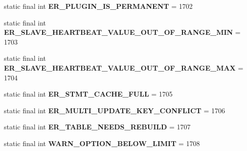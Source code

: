 \begin{DoxyCompactItemize}
static final int {\bfseries E\+R\+\_\+\+P\+L\+U\+G\+I\+N\+\_\+\+I\+S\+\_\+\+P\+E\+R\+M\+A\+N\+E\+NT} = 1702
\item 
\mbox{\label{classcom_1_1mysql_1_1jdbc_1_1_mysql_error_numbers_a6cb2fff2f0e4d19f239d44ee45fcc481}} 
static final int {\bfseries E\+R\+\_\+\+S\+L\+A\+V\+E\+\_\+\+H\+E\+A\+R\+T\+B\+E\+A\+T\+\_\+\+V\+A\+L\+U\+E\+\_\+\+O\+U\+T\+\_\+\+O\+F\+\_\+\+R\+A\+N\+G\+E\+\_\+\+M\+IN} = 1703
\item 
\mbox{\label{classcom_1_1mysql_1_1jdbc_1_1_mysql_error_numbers_a74ff538f3b76cb53e252ac11763fd349}} 
static final int {\bfseries E\+R\+\_\+\+S\+L\+A\+V\+E\+\_\+\+H\+E\+A\+R\+T\+B\+E\+A\+T\+\_\+\+V\+A\+L\+U\+E\+\_\+\+O\+U\+T\+\_\+\+O\+F\+\_\+\+R\+A\+N\+G\+E\+\_\+\+M\+AX} = 1704
\item 
\mbox{\label{classcom_1_1mysql_1_1jdbc_1_1_mysql_error_numbers_a0cd38cfd13a5d7d4a171f3716227128c}} 
static final int {\bfseries E\+R\+\_\+\+S\+T\+M\+T\+\_\+\+C\+A\+C\+H\+E\+\_\+\+F\+U\+LL} = 1705
\item 
\mbox{\label{classcom_1_1mysql_1_1jdbc_1_1_mysql_error_numbers_a3526dd0f26d6892cfc7b68efbaab62eb}} 
static final int {\bfseries E\+R\+\_\+\+M\+U\+L\+T\+I\+\_\+\+U\+P\+D\+A\+T\+E\+\_\+\+K\+E\+Y\+\_\+\+C\+O\+N\+F\+L\+I\+CT} = 1706
\item 
\mbox{\label{classcom_1_1mysql_1_1jdbc_1_1_mysql_error_numbers_a35347c98abfa0fa6dc2bf7c9ce850dd2}} 
static final int {\bfseries E\+R\+\_\+\+T\+A\+B\+L\+E\+\_\+\+N\+E\+E\+D\+S\+\_\+\+R\+E\+B\+U\+I\+LD} = 1707
\item 
\mbox{\label{classcom_1_1mysql_1_1jdbc_1_1_mysql_error_numbers_a97c9524b3cb17610f16c474e98ffa267}} 
static final int {\bfseries W\+A\+R\+N\+\_\+\+O\+P\+T\+I\+O\+N\+\_\+\+B\+E\+L\+O\+W\+\_\+\+L\+I\+M\+IT} = 1708
\item 
\mbox{\label{classcom_1_1mysql_1_1jdbc_1_1_mysql_error_numbers_a96fc7f354e2494ff97e3f52a13ea9237}} 

\end{DoxyCompactItemize}
